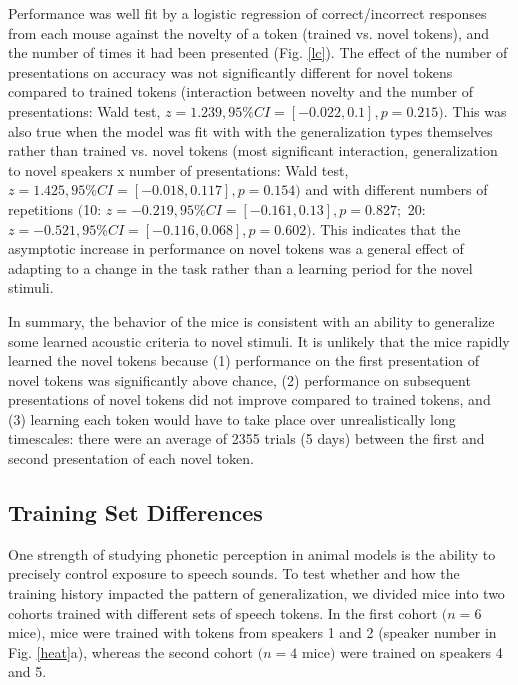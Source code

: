 \documentclass[11pt]{article}\usepackage[]{graphicx}\usepackage[]{color}
\begin{document}
Performance was well fit by a logistic regression of correct/incorrect responses from each mouse against the novelty of a token (trained vs. novel tokens), and the number of times it had been presented (Fig. \ref{lc}). The effect of the number of presentations on accuracy was not significantly different for novel tokens compared to trained tokens (interaction between novelty and the number of presentations: Wald test, $z = 1.239, 95\% CI = [-0.022, 0.1], p=0.215)$. This was also true when the model was fit with with the generalization types themselves rather than trained vs. novel tokens (most significant interaction, generalization to novel speakers x number of presentations: Wald test, $z = 1.425, 95\% CI = [-0.018, 0.117], p=0.154)$ and with different numbers of repetitions $($10: $z = -0.219, 95\% CI = [-0.161, 0.13], p=0.827;$ 20: $z = -0.521, 95\% CI = [-0.116, 0.068], p=0.602)$. This indicates that the asymptotic increase in performance on novel tokens was a general effect of adapting to a change in the task rather than a learning period for the novel stimuli.

In summary, the behavior of the mice is consistent with an ability to generalize some learned acoustic criteria to novel stimuli. It is unlikely that the mice rapidly learned the novel tokens because (1) performance on the first presentation of novel tokens was significantly above chance, (2) performance on subsequent presentations of novel tokens did not improve compared to trained tokens, and (3) learning each token would have to take place over unrealistically long timescales: there were an average of 2355 trials (5 days) between the first and second presentation of each novel token.

\subsection{Training Set Differences}

%
%
%
%
One strength of studying phonetic perception in animal models is the ability to precisely control exposure to speech sounds. To test whether and how the training history impacted the pattern of generalization, we divided mice into two cohorts trained with different sets of speech tokens. In the first cohort $ (n = 6$ mice$) $, mice were trained with tokens from speakers 1 and 2 (speaker number in Fig. \ref{heat}a), whereas the second cohort $ (n = 4$ mice$) $ were trained on speakers 4 and 5.
\end{document}
